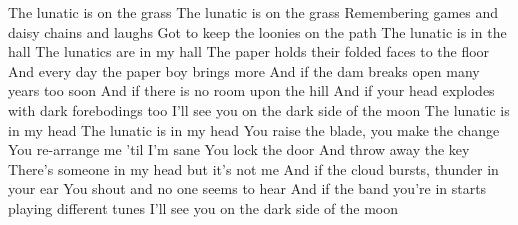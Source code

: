 The lunatic is on the grass
The lunatic is on the grass
Remembering games and daisy chains and laughs
Got to keep the loonies on the path
The lunatic is in the hall
The lunatics are in my hall
The paper holds their folded faces to the floor
And every day the paper boy brings more
And if the dam breaks open many years too soon
And if there is no room upon the hill
And if your head explodes with dark forebodings too
I'll see you on the dark side of the moon
The lunatic is in my head
The lunatic is in my head
You raise the blade, you make the change
You re-arrange me 'til I'm sane
You lock the door
And throw away the key
There's someone in my head but it's not me
And if the cloud bursts, thunder in your ear
You shout and no one seems to hear
And if the band you're in starts playing different tunes
I'll see you on the dark side of the moon